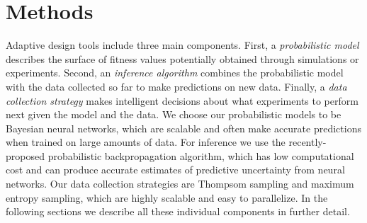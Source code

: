 \section{Methods}

Adaptive design tools include three main components. First, a \emph{probabilistic model} describes the surface of fitness values potentially obtained through simulations or experiments. Second, an \emph{inference algorithm} combines the probabilistic model with the data collected so far to make predictions on new data.  Finally, a \emph{data collection strategy} makes intelligent decisions about what experiments to perform next given the model and the data. We choose our probabilistic models to be Bayesian neural networks, which are scalable and often make accurate predictions when trained on large amounts of data. For inference we use the recently-proposed probabilistic backpropagation algorithm, which has low computational cost and can produce accurate estimates of predictive uncertainty from neural networks. Our data collection strategies are Thompsom sampling and maximum entropy sampling, which are highly scalable and easy to parallelize. In the following sections we describe all these individual components in further detail.




